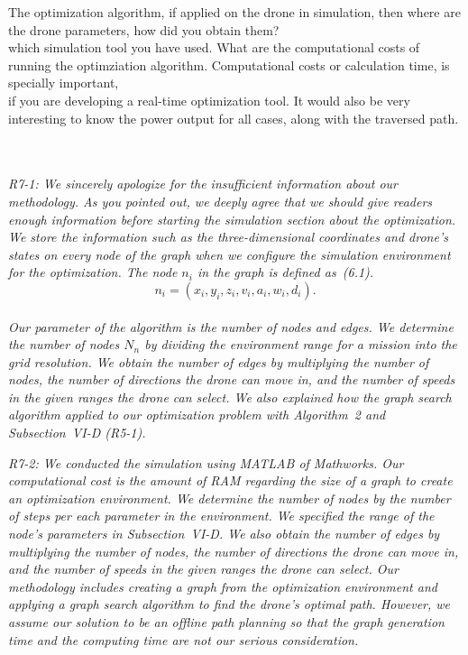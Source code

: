 \documentclass[onecolumn]{IEEEconf}
\begin{document}
\begin{description}
{	The optimization algorithm, if applied on the drone in simulation, then where are the drone parameters, how did you obtain them?~\\
	which simulation tool you have used. What are the computational costs of running the optimziation algorithm. Computational costs or calculation time, is specially important,~\\
	if you are developing a real-time optimization tool. It would also be very interesting to know the power output for all cases, along with the traversed path.
	}
	~\\
	~\\
	\item \textit
	{
	R7-1: We sincerely apologize for the insufficient information about our methodology. As you pointed out, we deeply agree that we should give readers enough information before starting the simulation section about the optimization.
    We store the information such as the three-dimensional coordinates and drone’s states on every node of the graph when we configure the simulation environment for the optimization.
    The node $n_i$ in the graph is defined as~(6.1).
    ~\\
    \begin{equation*}
    n_i = (x_i, y_i, z_i, v_i, a_i, w_i, d_i). \tag{6.1} \label{eq:node}
    \end{equation*}
    ~\\
    Our parameter of the algorithm is the number of nodes and edges. We determine the number of nodes $N_n$ by dividing the environment range for a mission into the grid resolution.
    We obtain the number of edges by multiplying the number of nodes, the number of directions the drone can move in, and the number of speeds in the given ranges the drone can select.
    We also explained how the graph search algorithm applied to our optimization problem with Algorithm~2 and Subsection~VI-D (R5-1).
	}
	~\\
	\item \textit
	{
	R7-2: We conducted the simulation using MATLAB of Mathworks. Our computational cost is the amount of RAM regarding the size of a graph to create an optimization environment. We determine the number of nodes by the number of steps per each parameter in the environment. We specified the range of the node's parameters in Subsection~VI-D.
    We also obtain the number of edges by multiplying the number of nodes, the number of directions the drone can move in, and the number of speeds in the given ranges the drone can select.
    Our methodology includes creating a graph from the optimization environment and applying a graph search algorithm to find the drone's optimal path. However, we assume our solution to be an offline path planning so that the graph generation time and the computing time are not our serious consideration.
}
\end{description}
\end{document}
